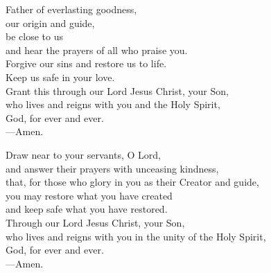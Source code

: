 \prayer


\begin{prayerverse}
Father of everlasting goodness,\\
our origin and guide,\\
be close to us\\
and hear the prayers of all who praise you.\\
Forgive our sins and restore us to life.\\
Keep us safe in your love.\\
Grant this through our Lord Jesus Christ, your Son,\\
who lives and reigns with you and the Holy Spirit,\\
God, for ever and ever.\\
{\color{red}---\thinspace}Amen.
\end{prayerverse}


\begin{prayerverse}
Draw near to your servants, O Lord,\\
and answer their prayers with unceasing kindness,\\
that, for those who glory in you as their Creator and guide,\\
you may restore what you have created\\
and keep safe what you have restored.\\
Through our Lord Jesus Christ, your Son,\\
who lives and reigns with you in the unity of the Holy Spirit,\\
God, for ever and ever.\\
{\color{red}---\thinspace}Amen.
\end{prayerverse}

